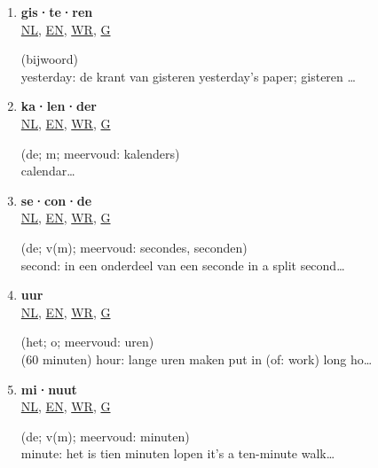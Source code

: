 \begin{multicols}{2}
\begin{enumerate}
\item \parbox[t][][t]{35mm}{\textbf{gis·te·ren}\\\href{https://www.vandale.nl/gratis-woordenboek/nederlands/betekenis/gisteren}{\tiny NL}{\tiny, }\href{https://www.vandale.nl/gratis-woordenboek/nederlands-engels/vertaling/gisteren}{\tiny EN}{\tiny, }\href{https://www.wordreference.com/nlen/gisteren}{\tiny WR}{\tiny, }\href{https://translate.google.com/\#view=home\&op=translate\&sl=nl\&tl=en\&text=gisteren}{\tiny G}} \parbox[t][][t]{55mm}{(bijwoord)\\yesterday: de krant van gisteren yesterday's paper; gisteren \ldots}
\item \parbox[t][][t]{35mm}{\textbf{ka·len·der}\\\href{https://www.vandale.nl/gratis-woordenboek/nederlands/betekenis/kalender}{\tiny NL}{\tiny, }\href{https://www.vandale.nl/gratis-woordenboek/nederlands-engels/vertaling/kalender}{\tiny EN}{\tiny, }\href{https://www.wordreference.com/nlen/kalender}{\tiny WR}{\tiny, }\href{https://translate.google.com/\#view=home\&op=translate\&sl=nl\&tl=en\&text=kalender}{\tiny G}} \parbox[t][][t]{55mm}{(de; m; meervoud: kalenders)\\calendar\ldots}
\item \parbox[t][][t]{35mm}{\textbf{se·con·de}\\\href{https://www.vandale.nl/gratis-woordenboek/nederlands/betekenis/seconde}{\tiny NL}{\tiny, }\href{https://www.vandale.nl/gratis-woordenboek/nederlands-engels/vertaling/seconde}{\tiny EN}{\tiny, }\href{https://www.wordreference.com/nlen/seconde}{\tiny WR}{\tiny, }\href{https://translate.google.com/\#view=home\&op=translate\&sl=nl\&tl=en\&text=seconde}{\tiny G}} \parbox[t][][t]{55mm}{(de; v(m); meervoud: secondes, seconden)\\second: in een onderdeel van een seconde in a split second\ldots}
\item \parbox[t][][t]{35mm}{\textbf{uur}\\\href{https://www.vandale.nl/gratis-woordenboek/nederlands/betekenis/uur}{\tiny NL}{\tiny, }\href{https://www.vandale.nl/gratis-woordenboek/nederlands-engels/vertaling/uur}{\tiny EN}{\tiny, }\href{https://www.wordreference.com/nlen/uur}{\tiny WR}{\tiny, }\href{https://translate.google.com/\#view=home\&op=translate\&sl=nl\&tl=en\&text=uur}{\tiny G}} \parbox[t][][t]{55mm}{(het; o; meervoud: uren)\\(60 minuten) hour: lange uren maken put in (of: work) long ho\ldots}
\item \parbox[t][][t]{35mm}{\textbf{mi·nuut}\\\href{https://www.vandale.nl/gratis-woordenboek/nederlands/betekenis/minuut}{\tiny NL}{\tiny, }\href{https://www.vandale.nl/gratis-woordenboek/nederlands-engels/vertaling/minuut}{\tiny EN}{\tiny, }\href{https://www.wordreference.com/nlen/minuut}{\tiny WR}{\tiny, }\href{https://translate.google.com/\#view=home\&op=translate\&sl=nl\&tl=en\&text=minuut}{\tiny G}} \parbox[t][][t]{55mm}{(de; v(m); meervoud: minuten)\\minute: het is tien minuten lopen it's a ten-minute walk\ldots}

\end{enumerate}
\end{multicols}
